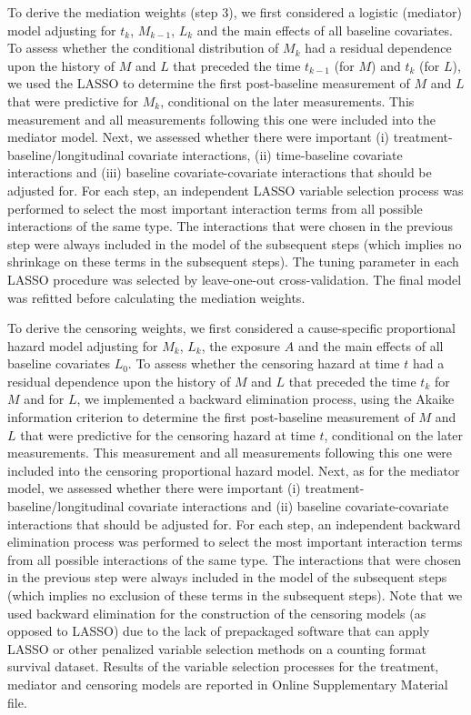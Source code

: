 \documentclass[AMA,STIX1COL]{WileyNJD-v2}
\begin{document}
To derive the mediation weights (step 3), we first considered a logistic (mediator) model adjusting for $t_k$, $M_{k-1}$, $L_k$ and the main effects of all baseline covariates. To assess whether the conditional distribution of $M_k$ had a residual dependence upon the history of $M$ and $L$ that preceded the time $t_{k-1}$ (for $M$) and $t_k$ (for $L$), we used the LASSO to determine the first post-baseline measurement of $M$ and $L$ that were predictive for $M_k$, conditional on the later measurements. This measurement and all measurements following this one were included into the mediator model. Next, we assessed whether there were important (i) treatment-baseline/longitudinal covariate interactions, (ii) time-baseline covariate interactions and (iii) baseline covariate-covariate interactions that should be adjusted for. For each step, an independent LASSO variable selection process was performed to select the most important interaction terms from all possible interactions of the same type. The interactions that were chosen in the previous step were always included in the model of the subsequent steps (which implies no shrinkage on these terms in the subsequent steps). The tuning parameter in each LASSO procedure was selected by leave-one-out cross-validation. The final model was refitted before calculating the mediation weights.

To derive the censoring weights, we first considered a cause-specific proportional hazard model adjusting for $M_{k}$, $L_k$, the exposure $A$ and the main effects of all baseline covariates $L_0$. To assess whether the censoring hazard at time $t$ had a residual dependence upon the history of $M$ and $L$ that preceded the time $t_{k}$ for $M$ and for $L$, we implemented a backward elimination process, using the Akaike information criterion to determine the first post-baseline measurement of $M$ and $L$ that were predictive for the censoring hazard at time $t$, conditional on the later measurements. This measurement and all measurements following this one were included into the censoring proportional hazard model. Next, as for the mediator model, we assessed whether there were important (i) treatment-baseline/longitudinal covariate interactions and (ii) baseline covariate-covariate interactions that should be adjusted for. For each step, an independent backward elimination process was performed to select the most important interaction terms from all possible interactions of the same type. The interactions that were chosen in the previous step were always included in the model of the subsequent steps (which implies no exclusion of these terms in the subsequent steps). Note that we used backward elimination for the construction of the censoring models (as opposed to LASSO) due to the lack of prepackaged software that can apply LASSO or other penalized variable selection methods on a counting format survival dataset. Results of the variable selection processes for the treatment, mediator and censoring models are reported in Online Supplementary Material file.
\end{document}
